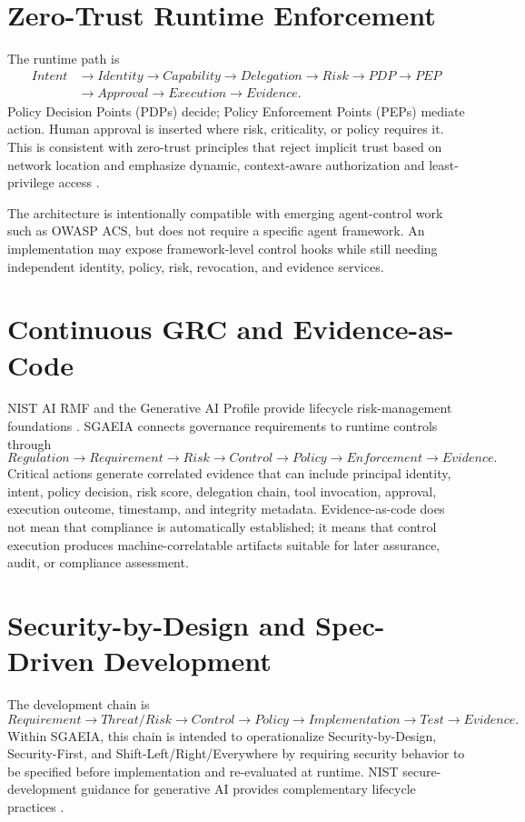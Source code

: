 \documentclass[11pt]{article}
\newcommand{\sgaeia}{\textsc{SGAEIA}}
\begin{document}
\section{Zero-Trust Runtime Enforcement}
The runtime path is
\[
\begin{aligned}
Intent&\rightarrow Identity\rightarrow Capability\rightarrow Delegation\rightarrow Risk\rightarrow PDP\rightarrow PEP\\
&\rightarrow Approval\rightarrow Execution\rightarrow Evidence.
\end{aligned}
\]
Policy Decision Points (PDPs) decide; Policy Enforcement Points (PEPs) mediate action. Human approval is inserted where risk, criticality, or policy requires it. This is consistent with zero-trust principles that reject implicit trust based on network location and emphasize dynamic, context-aware authorization and least-privilege access \cite{nist207,nist207a}.

The architecture is intentionally compatible with emerging agent-control work such as OWASP ACS, but does not require a specific agent framework. An implementation may expose framework-level control hooks while still needing independent identity, policy, risk, revocation, and evidence services.

\section{Continuous GRC and Evidence-as-Code}
NIST AI RMF and the Generative AI Profile provide lifecycle risk-management foundations \cite{nistrmf,nistgenai}. \sgaeia{} connects governance requirements to runtime controls through
\[
Regulation\rightarrow Requirement\rightarrow Risk\rightarrow Control\rightarrow Policy\rightarrow Enforcement\rightarrow Evidence.
\]
Critical actions generate correlated evidence that can include principal identity, intent, policy decision, risk score, delegation chain, tool invocation, approval, execution outcome, timestamp, and integrity metadata. Evidence-as-code does not mean that compliance is automatically established; it means that control execution produces machine-correlatable artifacts suitable for later assurance, audit, or compliance assessment.

\section{Security-by-Design and Spec-Driven Development}
The development chain is
\[
Requirement\rightarrow Threat/Risk\rightarrow Control\rightarrow Policy\rightarrow Implementation\rightarrow Test\rightarrow Evidence.
\]
Within \sgaeia{}, this chain is intended to operationalize Security-by-Design, Security-First, and Shift-Left/Right/Everywhere by requiring security behavior to be specified before implementation and re-evaluated at runtime. NIST secure-development guidance for generative AI provides complementary lifecycle practices \cite{nistssdfai}.
\end{document}
